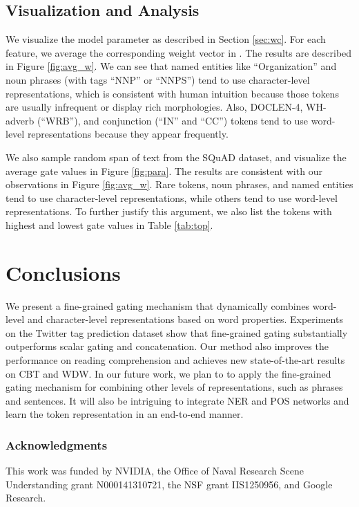 \documentclass{article} \usepackage{iclr2017_conference,times}
\begin{document}
\subsection{Visualization and Analysis}

We visualize the model parameter  as described in Section \ref{sec:wc}. For each feature, we average the corresponding weight vector in . The results are described in Figure \ref{fig:avg_w}. We can see that named entities like ``Organization'' and noun phrases (with tags ``NNP'' or ``NNPS'') tend to use character-level representations, which is consistent with human intuition because those tokens are usually infrequent or display rich morphologies. Also, DOCLEN-4, WH-adverb (``WRB''), and conjunction (``IN'' and ``CC'') tokens tend to use word-level representations because they appear frequently.

We also sample random span of text from the SQuAD dataset, and visualize the average gate values in Figure \ref{fig:para}. The results are consistent with our observations in Figure \ref{fig:avg_w}. Rare tokens, noun phrases, and named entities tend to use character-level representations, while others tend to use word-level representations. To further justify this argument, we also list the tokens with highest and lowest gate values in Table \ref{tab:top}.











 
\section{Conclusions}

We present a fine-grained gating mechanism that dynamically combines word-level and character-level representations based on word properties. Experiments on the Twitter tag prediction dataset show that fine-grained gating substantially outperforms scalar gating and concatenation. Our method also improves the performance on reading comprehension and achieves new state-of-the-art results on CBT and WDW. In our future work, we plan to to apply the fine-grained gating mechanism for combining other levels of representations, such as phrases and sentences. It will also be intriguing to integrate NER and POS networks and learn the token representation in an end-to-end manner.
 
\subsubsection*{Acknowledgments}

This work was funded by NVIDIA, the Office of Naval Research Scene Understanding grant N000141310721, the NSF grant IIS1250956, and Google Research.

\small


\end{document}
